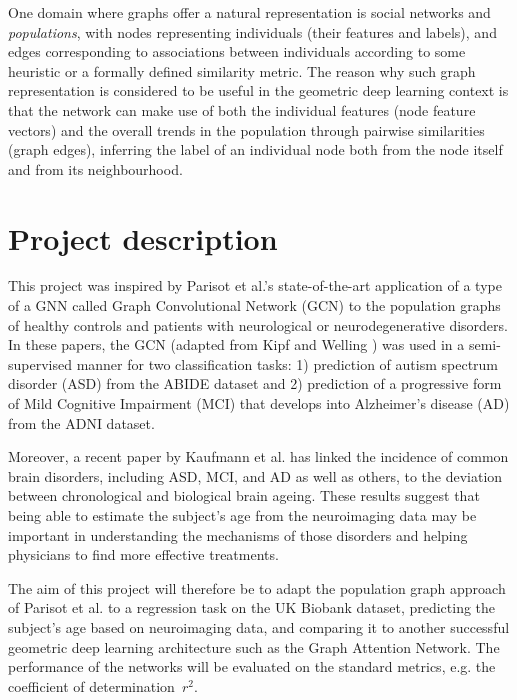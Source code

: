 One domain where graphs offer a natural representation is social networks and \textit{populations}, with nodes representing individuals (their features and labels), and edges corresponding to associations between individuals according to some heuristic or a formally defined similarity metric. The reason why such graph representation is considered to be useful in the geometric deep learning context is that the network can make use of both the individual features (node feature vectors) and the overall trends in the population through pairwise similarities (graph edges), \cite{parisot2017spectral} inferring the label of an individual node both from the node itself and from its neighbourhood.

\section*{Project description}
This project was inspired by Parisot et al.'s \cite{parisot2017spectral, parisot2018disease} state-of-the-art application of a type of a GNN called Graph Convolutional Network (GCN) to the population graphs of healthy controls and patients with neurological or neurodegenerative disorders. In these papers, the GCN (adapted from Kipf and Welling \cite{kipf2017semi}) was used in a semi-supervised manner for two classification tasks: 1) prediction of autism spectrum disorder (ASD) from the ABIDE dataset and 2) prediction of a progressive form of Mild Cognitive Impairment (MCI) that develops into Alzheimer's disease (AD) from the ADNI dataset.

Moreover, a recent paper by Kaufmann et al. \cite{kaufmann2019} has linked the incidence of common brain disorders, including ASD, MCI, and AD as well as others, to the deviation between chronological and biological brain ageing. These results suggest that being able to estimate the subject's age from the neuroimaging data may be important in understanding the mechanisms of those disorders and helping physicians to find more effective treatments.

The aim of this project will therefore be to adapt the population graph approach of Parisot et al. \cite{parisot2017spectral, parisot2018disease} to a regression task on the UK Biobank dataset, predicting the subject's age based on neuroimaging data, and comparing it to another successful geometric deep learning architecture such as the Graph Attention Network. \cite{velickovic2018graph} The performance of the networks will be evaluated on the standard metrics, e.g. the coefficient of determination~$r^2$.

